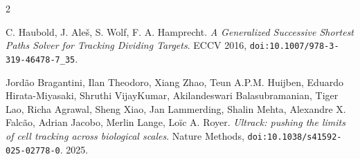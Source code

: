 \backmatter
{}
\begin{thebibliography}{2}

C. Haubold, J. Aleš, S. Wolf, F. A. Hamprecht. \emph{A Generalized Successive Shortest Paths Solver for Tracking Dividing Targets}. ECCV 2016, \texttt{doi:10.1007/\allowbreak{}978-3-319-46478-7\_\allowbreak{}35}.

Jordão Bragantini, Ilan Theodoro, Xiang Zhao, Teun A.P.M. Huijben, Eduardo Hirata-Miyasaki, Shruthi VijayKumar, Akilandeswari Balasubramanian, Tiger Lao, Richa Agrawal, Sheng Xiao, Jan Lammerding, Shalin Mehta, Alexandre X. Falcão, Adrian Jacobo, Merlin Lange, Loïc A. Royer. \emph{Ultrack: pushing the limits of cell tracking across biological scales}. Nature Methods, \texttt{doi:10.1038/\allowbreak{}s41592-025-02778-0}. 2025.

\end{thebibliography}
